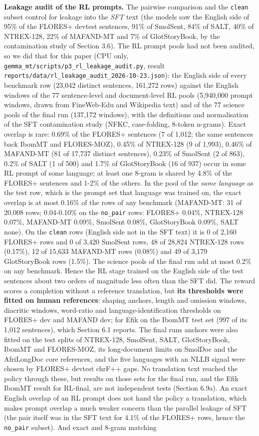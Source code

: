 \textbf{Leakage audit of the RL prompts.} The pairwise comparison and the \texttt{clean} subset control for leakage into the \emph{SFT} text (the models saw the English side of 95\% of the FLORES+ devtest sentences, 91\% of SmolSent, 84\% of SALT, 40\% of NTREX-128, 22\% of MAFAND-MT and 7\% of GlotStoryBook, by the contamination study of Section 3.6). The RL prompt pools had not been audited, so we did that for this paper (CPU only, \texttt{gemma\_mt/scripts/p3\_rl\_leakage\_audit.py}, result \texttt{reports/data/rl\_leakage\_audit\_2026-10-23.json}): the English side of every benchmark row (23,042 distinct sentences, 161,272 rows) against the English windows of the 77 sentence-level and document-level RL pools (5,940,000 prompt windows, drawn from FineWeb-Edu and Wikipedia text) and of the 77 science pools of the final run (137,172 windows), with the definitions and normalisation of the SFT contamination study (NFKC, case-folding, 8-token n-grams). Exact overlap is rare: 0.69\% of the FLORES+ sentences (7 of 1,012; the same sentences back IbomMT and FLORES-MOZ), 0.45\% of NTREX-128 (9 of 1,993), 0.46\% of MAFAND-MT (81 of 17,737 distinct sentences), 0.23\% of SmolSent (2 of 863), 0.2\% of SALT (1 of 500) and 1.7\% of GlotStoryBook (16 of 937) occur in some RL prompt of some language; at least one 8-gram is shared by 4.8\% of the FLORES+ sentences and 1-2\% of the others. In the pool of the \emph{same language} as the test row, which is the prompt set that language was trained on, the exact overlap is at most 0.16\% of the rows of any benchmark (MAFAND-MT: 31 of 20,008 rows; 0.04-0.10\% on the \texttt{no\_pair} rows: FLORES+ 0.04\%, NTREX-128 0.07\%, MAFAND-MT 0.09\%, SmolSent 0.08\%, GlotStoryBook 0.09\%, SALT none). On the \texttt{clean} rows (English side not in the SFT text) it is 0 of 2,160 FLORES+ rows and 0 of 3,420 SmolSent rows, 48 of 28,824 NTREX-128 rows (0.17\%), 12 of 15,633 MAFAND-MT rows (0.08\%) and 49 of 3,179 GlotStoryBook rows (1.5\%). The science pools of the final run add at most 0.2\% on any benchmark. Hence the RL stage trained on the English side of the test sentences about two orders of magnitude less often than the SFT did. The reward scores a completion without a reference translation, but \textbf{its thresholds were fitted on human references}: shaping anchors, length and omission windows, diacritic windows, word-ratio and language-identification thresholds on FLORES+ dev and MAFAND dev; for Efik on the IbomMT test set (997 of its 1,012 sentences), which Section 6.1 reports. The final run\textquotesingle s anchors were also fitted on the test splits of NTREX-128, SmolSent, SALT, GlotStoryBook, IbomMT and FLORES-MOZ, its long-document limits on SmolDoc and the AfriLongDoc core references, and the five languages with an NLLB signal were chosen by FLORES+ devtest chrF++ gaps. No translation text reached the policy through these, but results on those sets for the final run, and the Efik IbomMT result for RL-final, are not independent tests (Section 6.9a). An exact English overlap of an RL prompt does not hand the policy a translation, which makes prompt overlap a much weaker concern than the parallel leakage of SFT (the pair itself was in the SFT text for 4.1\% of the FLORES+ rows, hence the \texttt{no\_pair} subset). And exact and 8-gram matching 